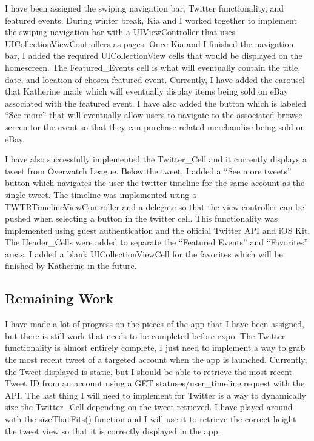 \documentclass[onecolumn, draftclsnofoot,10pt, compsoc]{IEEEtran}
\begin{document}
\noindent I have been assigned the swiping navigation bar, Twitter functionality, and featured events. During winter break, Kia and I worked together to implement the swiping navigation bar with a UIViewController that uses UICollectionViewControllers as pages. Once Kia and I finished the navigation bar, I added the required UICollectionView cells that would be displayed on the homescreen. The Featured\_Events cell is what will eventually contain the title, date, and location of chosen featured event. Currently, I have added the carousel that Katherine made which will eventually display items being sold on eBay associated with the featured event. I have also added the button which is labeled “See more” that will eventually allow users to navigate to the associated browse screen for the event so that they can purchase related merchandise being sold on eBay. \newline

\noindent I have also successfully implemented the Twitter\_Cell and it currently displays a tweet from Overwatch League. Below the tweet, I added a “See more tweets” button which navigates the user the twitter timeline for the same account as the single tweet. The timeline was implemented using a TWTRTimelineViewController and a delegate so that the view controller can be pushed when selecting a button in the twitter cell. This functionality was implemented using guest authentication and the official Twitter API and iOS Kit. The Header\_Cells were added to separate the “Featured Events” and “Favorites” areas. I added a blank UICollectionViewCell for the favorites which will be finished by Katherine in the future. 

\subsection{Remaining Work}
I have made a lot of progress on the pieces of the app that I have been assigned, but there is still work that needs to be completed before expo. The Twitter functionality is almost entirely complete, I just need to implement a way to grab the most recent tweet of a targeted account when the app is launched. Currently, the Tweet displayed is static, but I should be able to retrieve the most recent Tweet ID from an account using a GET statuses/user\_timeline request with the API. The last thing I will need to implement for Twitter is a way to dynamically size the Twitter\_Cell depending on the tweet retrieved. I have played around with the sizeThatFits() function and I will use it to retrieve the correct height the tweet view so that it is correctly displayed in the app. \newline
\end{document}
